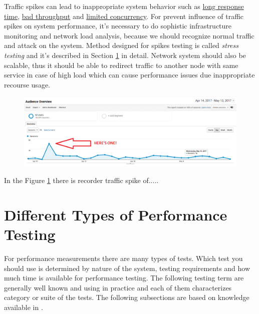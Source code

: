 Traffic spikes can lead to inappropriate system behavior such as \underline{long response time}, \underline{bad throughput} and \underline{limited concurrency}. For prevent influence of traffic spikes on system performance, it's  necessary to do sophistic infrastructure monitoring and network load analysis, because we should recognize normal traffic and attack on the system. Method designed for spikes testing is called \emph{stress testing} \cite{Manzor:APTB} and it's described in Section \ref{Different Types of Performance Testing} in detail. Network system should also be scalable, thus it should be able to redirect traffic to another node with same service in case of high load which can cause performance issues due inappropriate recourse usage.

\begin{figure}[H]
  \centering
  \includegraphics[width=15cm]{obrazky-figures/spike.png}
  \caption{}
  \label{fig:spikes}
\end{figure}

In the Figure \ref{fig:spikes} there is recorder traffic spike of.....

\section{Different Types of Performance Testing}
\label{Different Types of Performance Testing}

For performance measurements there are many types of tests. Which test you should use is determined by nature of the system, testing requirements and how much time is available for performance testing. The following testing term are generally well known and using in practice and each of them characterizes category or suite of the tests. The following subsections are based on knowledge available in \cite{TuPo:TESTS, BUCH:4TYPES, Molyneaux:TAoAPT}.

